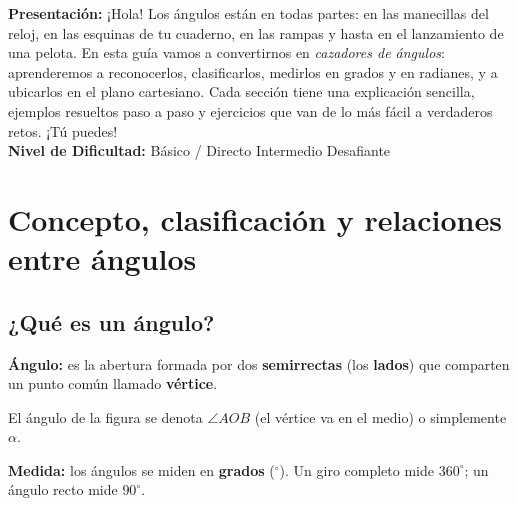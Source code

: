 \documentclass[12pt, letterpaper]{article}
\begin{document}


\vspace{4pt}
\begin{cuadroinfo}
  \small
  \textbf{Presentación:} ¡Hola! Los ángulos están en todas partes: en las manecillas del reloj, en las esquinas de tu cuaderno, en las rampas y hasta en el lanzamiento de una pelota. En esta guía vamos a convertirnos en \emph{cazadores de ángulos}: aprenderemos a reconocerlos, clasificarlos, medirlos en grados y en radianes, y a ubicarlos en el plano cartesiano. Cada sección tiene una explicación sencilla, ejemplos resueltos paso a paso y ejercicios que van de lo más fácil a verdaderos retos. ¡Tú puedes!
  \\[4pt]
  \textbf{Nivel de Dificultad:}\quad
  \facil{} Básico / Directo \quad
  \medio{} Intermedio \quad
  \dificil{} Desafiante
\end{cuadroinfo}

\vspace{8pt}

\section{Concepto, clasificación y relaciones entre ángulos}

\subsection{¿Qué es un ángulo?}

\begin{cuadroteoria}
  \textbf{Ángulo:} es la abertura formada por dos \textbf{semirrectas} (los \textbf{lados}) que comparten un punto común llamado \textbf{vértice}.
  \begin{center}
  \end{center}
  El ángulo de la figura se denota $\angle AOB$ (el vértice va en el medio) o simplemente $\alpha$.

  \textbf{Medida:} los ángulos se miden en \textbf{grados} ($^{\circ}$). Un giro completo mide $360^{\circ}$; un ángulo recto mide $90^{\circ}$.
\end{cuadroteoria}
\end{document}
